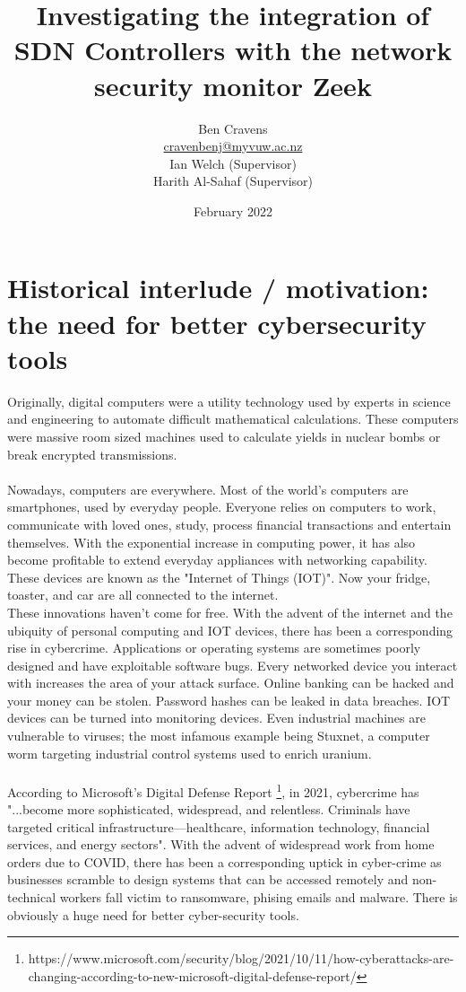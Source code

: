 \documentclass{article}
\title{Investigating the integration of SDN Controllers with the network security monitor Zeek}
\author{Ben Cravens\\[1ex] 
\url{cravenbenj@myvuw.ac.nz}
\\[1ex]
Ian Welch (Supervisor)\\[1ex] Harith Al-Sahaf (Supervisor)}
\date{February 2022}
\begin{document}
\maketitle

\newpage
\tableofcontents
\newpage

\section{Historical interlude / motivation: the need for better cybersecurity tools}
Originally, digital computers were a utility technology used by experts in science and engineering to automate difficult mathematical calculations. These computers were massive room sized machines used to calculate yields in nuclear bombs or break encrypted transmissions.
\\
\\
Nowadays, computers are everywhere. Most of the world's computers are smartphones, used by everyday people. Everyone relies on computers to work, communicate with loved ones, study, process financial transactions and entertain themselves. With the exponential increase in computing power, it has also become profitable to extend everyday appliances with networking capability. These devices are known as the "Internet of Things (IOT)". Now your fridge, toaster, and car are all connected to the internet.
\\
These innovations haven't come for free. With the advent of the internet and the ubiquity of personal computing and IOT devices, there has been a corresponding rise in cybercrime. Applications or operating systems are sometimes poorly designed and have exploitable software bugs. Every networked device you interact with increases the area of your attack surface. Online banking can be hacked and your money can be stolen. Password hashes can be leaked in data breaches. IOT devices can be turned into monitoring devices. Even industrial machines are vulnerable to viruses; the most infamous example being Stuxnet, a computer worm targeting industrial control systems used to enrich uranium. 
\\
\\
According to Microsoft's Digital Defense Report \footnote{https://www.microsoft.com/security/blog/2021/10/11/how-cyberattacks-are-changing-according-to-new-microsoft-digital-defense-report/}, in 2021, cybercrime has "...become more sophisticated, widespread, and relentless. Criminals have targeted critical infrastructure—healthcare, information technology, financial services, and energy sectors". With the advent of widespread work from home orders due to COVID, there has been a corresponding uptick in cyber-crime as businesses scramble to design systems that can be accessed remotely and non-technical workers fall victim to ransomware, phising emails and malware. There is obviously a huge need for better cyber-security tools.
\end{document}
